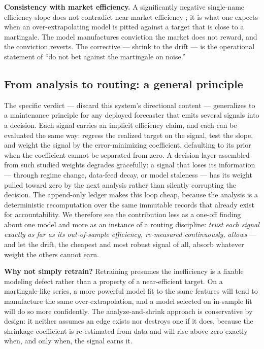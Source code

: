 \documentclass[10pt,twocolumn,twoside]{eec_style}
\begin{document}
\textbf{Consistency with market efficiency.} A significantly negative single-name
efficiency slope does not contradict near-market-efficiency \cite{fama1970,welch2008};
it is what one expects when an over-extrapolating model is pitted against a target that
is close to a martingale. The model manufactures conviction the market does not reward,
and the conviction reverts. The corrective --- shrink to the drift --- is the operational
statement of ``do not bet against the martingale on noise.''

\subsection{From analysis to routing: a general principle}
\label{sec:routing}
The specific verdict --- discard this system's directional content --- generalizes to a
maintenance principle for any deployed forecaster that emits several signals into a
decision. Each signal carries an implicit efficiency claim, and each can be evaluated the
same way: regress the realized target on the signal, test the slope, and weight the
signal by the error-minimizing coefficient, defaulting to its prior when the
coefficient cannot be separated from zero. A decision layer assembled from such studied
weights degrades gracefully: a signal that loses its information --- through regime
change, data-feed decay, or model staleness --- has its weight pulled toward zero by the
next analysis rather than silently corrupting the decision. The append-only ledger makes
this loop cheap, because the analysis is a deterministic recomputation over the same
immutable records that already exist for accountability. We therefore see the
contribution less as a one-off finding about one model and more as an instance of a
routing discipline: \emph{trust each signal exactly as far as its out-of-sample
efficiency, re-measured continuously, allows} --- and let the drift, the cheapest and
most robust signal of all, absorb whatever weight the others cannot earn.

\textbf{Why not simply retrain?} Retraining presumes the inefficiency is a fixable
modeling defect rather than a property of a near-efficient target. On a martingale-like
series, a more powerful model fit to the same features will tend to manufacture the same
over-extrapolation, and a model selected on in-sample fit will do so more confidently.
The analyze-and-shrink approach is conservative by design: it neither assumes an edge exists
nor destroys one if it does, because the shrinkage coefficient is re-estimated from data
and will rise above zero exactly when, and only when, the signal earns it.
\end{document}
